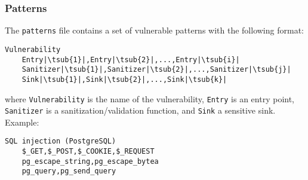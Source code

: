 \subsubsection*{Patterns}
\label{sec:expr.patterns}

The \verb|patterns| file contains a set of vulnerable patterns with the
following format:

\begin{lstlisting}[label={lst:pat.tmpl},
        caption={Vulnerable pattern template}]
    Vulnerability
    Entry|\tsub{1}|,Entry|\tsub{2}|,...,Entry|\tsub{i}|
    Sanitizer|\tsub{1}|,Sanitizer|\tsub{2}|,...,Sanitizer|\tsub{j}|
    Sink|\tsub{1}|,Sink|\tsub{2}|,...,Sink|\tsub{k}|
\end{lstlisting}

where \verb|Vulnerability| is the name of the vulnerability, \verb|Entry| is an
entry point, \verb|Sanitizer| is a sanitization/validation function, and
\verb|Sink| a sensitive sink. Example:

\begin{lstlisting}[label={lst:pat.ex},
        caption={SQL Injection pattern, specific to PostgreSQL}]
    SQL injection (PostgreSQL)
    $_GET,$_POST,$_COOKIE,$_REQUEST
    pg_escape_string,pg_escape_bytea
    pg_query,pg_send_query
\end{lstlisting}
